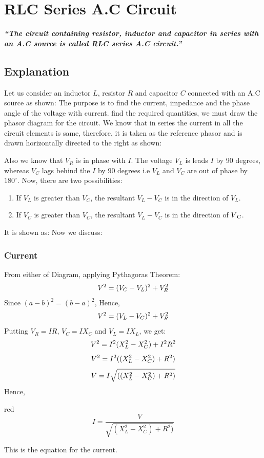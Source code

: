\section{RLC Series A.C Circuit}
\textit{\textbf{“The circuit containing resistor, inductor and
capacitor in series with an A.C source is called RLC series A.C circuit.”}}
\subsection{Explanation}
Let us consider an inductor $L$, resistor $R$ and capacitor $C$
connected with an A.C source as shown:
The purpose is to find the current, impedance and the phase angle of the
voltage with current.  find the required quantities, we must draw the
phasor diagram for the circuit. We know that in series the current in
all the circuit elements is same, therefore, it is taken as the
reference phasor and is drawn horizontally directed to the right as shown:
   
Also we know that $V_{R}$  is in phase with $I$. The
voltage $V_{L}$ is leads $I$ by 90 degrees,
whereas $V_{C}$ lags behind the $I$ by 90 degrees i.e $V_{L}$ and
$V_{C}$ are out of phase by $180^{\circ}$.   
Now, there are two possibilities:
\begin{enumerate}[label = (\roman*)]
    \item If $V_{L}$ is greater than $V_{C}$,
    the resultant $V_{L}-V_{C}$ is in the direction of $V_{L}$.
    \item If $V_{C}$ is greater than $V_{C}$, the resultant $V_{L}-V_{C}$
    is in the direction of $V\textsubscript{C}$.
\end{enumerate}
It is shown as:
Now we discuss:
\subsubsection*{Current}
From either of Diagram, applying Pythagoras Theorem:
\begin{equation}\notag
    V^{2}=(V_{C}-V_{L})^{2} + V_{R}^{2}
\end{equation}
Since $(a-b)^{2}=(b-a)^2$, Hence,
\begin{equation}\notag
    V^{2}=(V_{L}-V_{C})^{2} + V_{R}^{2}
\end{equation}
Putting $V_{R}=IR$, $V_{C}=IX_{C}$ and
$V_{L}=IX_{L}$, we get:
\begin{equation}\notag
    V^{2}=I^{2}(X_{L}^{2}-X_{C}^{2}) + I^{2}R^{2}
\end{equation}
\begin{equation}\notag
    V^{2}=I^{2} ((X_{L}^{2}-X_{C}^{2}) + R^{2})
\end{equation}
\begin{equation}\notag
    V=I \sqrt{ ((X_{L}^{2}-X_{C}^{2}) + R^{2})}
\end{equation}
Hence,
\begin{mybox}{red}{}
\begin{equation}\label{eq:15.34}
    I=\frac{V}{\sqrt{ (X_{L}^{2}-X_{C}^{2}) + R^{2})}}
\end{equation}
\end{mybox}
\noindent This is the equation for the current.
